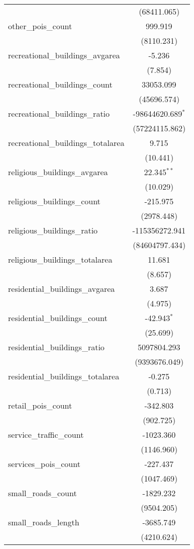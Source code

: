 \begin{table}[!htbp]
\begin{tabular}{@{\extracolsep{5pt}}lc}
  & (68411.065) \\
 other_pois_count & 999.919$^{}$ \\
  & (8110.231) \\
 recreational_buildings_avgarea & -5.236$^{}$ \\
  & (7.854) \\
 recreational_buildings_count & 33053.099$^{}$ \\
  & (45696.574) \\
 recreational_buildings_ratio & -98644620.689$^{*}$ \\
  & (57224115.862) \\
 recreational_buildings_totalarea & 9.715$^{}$ \\
  & (10.441) \\
 religious_buildings_avgarea & 22.345$^{**}$ \\
  & (10.029) \\
 religious_buildings_count & -215.975$^{}$ \\
  & (2978.448) \\
 religious_buildings_ratio & -115356272.941$^{}$ \\
  & (84604797.434) \\
 religious_buildings_totalarea & 11.681$^{}$ \\
  & (8.657) \\
 residential_buildings_avgarea & 3.687$^{}$ \\
  & (4.975) \\
 residential_buildings_count & -42.943$^{*}$ \\
  & (25.699) \\
 residential_buildings_ratio & 5097804.293$^{}$ \\
  & (9393676.049) \\
 residential_buildings_totalarea & -0.275$^{}$ \\
  & (0.713) \\
 retail_pois_count & -342.803$^{}$ \\
  & (902.725) \\
 service_traffic_count & -1023.360$^{}$ \\
  & (1146.960) \\
 services_pois_count & -227.437$^{}$ \\
  & (1047.469) \\
 small_roads_count & -1829.232$^{}$ \\
  & (9504.205) \\
 small_roads_length & -3685.749$^{}$ \\
  & (4210.624) \\

\end{tabular}
\end{table}
